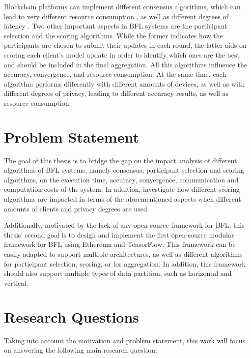 Blockchain platforms can implement different consensus algorithms, which can lead to very different resource consumption \cite{ccaf}, as well as different degrees of latency \cite{Alqahtani_2021}. Two other important aspects in BFL systems are the participant selection and the scoring algorithms. While the former indicates how the participants are chosen to submit their updates in each round, the latter aids on scoring each client's model update in order to identify which ones are the best and should be included in the final aggregation. All this algorithms influence the accuracy, convergence, and resource consumption. At the same time, each algorithm performs differently with different amounts of devices, as well as with different degrees of privacy, leading to different accuracy results, as well as resource consumption.

\section{Problem Statement}\label{intro:problem}

The goal of this thesis is to bridge the gap on the impact analysis of different algorithms of BFL systems, namely consensus, participant selection and scoring algorithms, on the execution time, accuracy, convergence, communication and computation costs of the system. In addition, investigate how different scoring algorithms are impacted in terms of the aforementioned aspects when different amounts of clients and privacy degrees are used.

Additionally, motivated by the lack of any open-source framework for BFL, this thesis' second goal is to design and implement the first open-source modular framework for BFL using Ethereum\cite{wood2014ethereum} and TensorFlow\cite{tensorflow2015-whitepaper}. This framework can be easily adapted to support multiple architectures, as well as different algorithms for participant selection, scoring, or for aggregation. In addition, this framework should also support multiple types of data partition, such as horizontal and vertical.

\section{Research Questions}\label{intro:questions}

Taking into account the motivation and problem statement, this work will focus on answering the following main research question:

